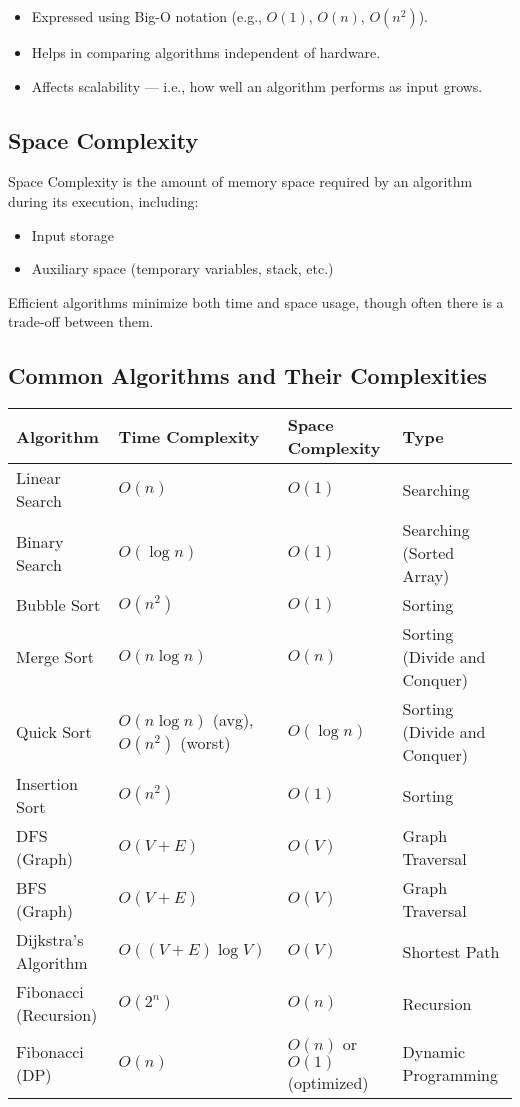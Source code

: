 \begin{itemize}
  \item Expressed using Big-O notation (e.g., $O(1)$, $O(n)$, $O(n^2)$).
  \item Helps in comparing algorithms independent of hardware.
  \item Affects scalability — i.e., how well an algorithm performs as input grows.
\end{itemize}

\subsection*{\large \textbf{Space Complexity}}

Space Complexity is the amount of memory space required by an algorithm during its execution, including:

\begin{itemize}
  \item Input storage
  \item Auxiliary space (temporary variables, stack, etc.)
\end{itemize}

Efficient algorithms minimize both time and space usage, though often there is a trade-off between them.

\subsection*{\large \textbf{Common Algorithms and Their Complexities}}

\renewcommand{\arraystretch}{1.5}
\begin{tabular}{|>{\raggedright\arraybackslash}p{4cm}|
                >{\raggedright\arraybackslash}p{3cm}|
                >{\raggedright\arraybackslash}p{3cm}|
                >{\raggedright\arraybackslash}p{3.5cm}|}
\hline
\textbf{Algorithm} & \textbf{Time Complexity} & \textbf{Space Complexity} & \textbf{Type} \\
\hline
Linear Search & $O(n)$ & $O(1)$ & Searching \\
\hline
Binary Search & $O(\log n)$ & $O(1)$ & Searching (Sorted Array) \\
\hline
Bubble Sort & $O(n^2)$ & $O(1)$ & Sorting \\
\hline
Merge Sort & $O(n \log n)$ & $O(n)$ & Sorting (Divide and Conquer) \\
\hline
Quick Sort & $O(n \log n)$ (avg), $O(n^2)$ (worst) & $O(\log n)$ & Sorting (Divide and Conquer) \\
\hline
Insertion Sort & $O(n^2)$ & $O(1)$ & Sorting \\
\hline
DFS (Graph) & $O(V + E)$ & $O(V)$ & Graph Traversal \\
\hline
BFS (Graph) & $O(V + E)$ & $O(V)$ & Graph Traversal \\
\hline
Dijkstra’s Algorithm & $O((V + E)\log V)$ & $O(V)$ & Shortest Path \\
\hline
Fibonacci (Recursion) & $O(2^n)$ & $O(n)$ & Recursion \\
\hline
Fibonacci (DP) & $O(n)$ & $O(n)$ or $O(1)$ (optimized) & Dynamic Programming \\
\hline
\end{tabular}

